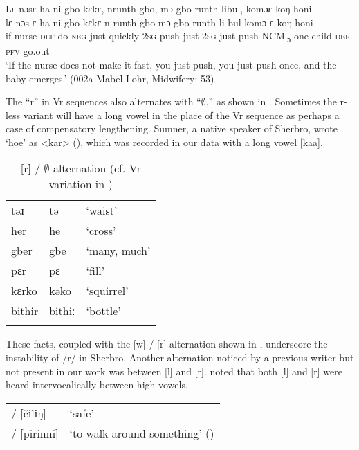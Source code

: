 \ex \label{ex:23b}
Lɛ nɔsɛ ha ni gbo kɛkɛ, nrunth gbo, mɔ gbo runth libul, komɔɛ koŋ honi.\\
\gll lɛ  nɔs  ɛ    ha    ni    gbo  kɛkɛ    n    runth    gbo mɔ  gbo  runth    li-bul        komɔ    ɛ    koŋ  honi\\
if  nurse  \textsc{def}  do    \textsc{neg}  just  quickly  \textsc{2sg}  push    just \textsc{2sg}  just  push    \textsc{NCM}\textsubscript{lɔ}{}-one    child    \textsc{def}  \textsc{pfv}  go.out\\
\glt ‘If the nurse does not make it fast, you just push, you just push once, and the baby emerges.' (002a Mabel Lohr, Midwifery: 53)
\z
\z

The “r” in Vr sequences also alternates with “${\emptyset}$,” as shown in . Sometimes the r-less variant will have a long vowel in the place of the Vr sequence as perhaps a case of compensatory lengthening. Sumner, a native speaker of Sherbro, wrote ‘hoe' as <kar> (\citealt{Sumner1921}), which was recorded in our data with a long vowel [kaa].

\begin{table}
\caption{\label{tab:phon:11}[r] / ${\emptyset}$ alternation (cf. Vr variation in )}
\begin{tabular}[t]{lll}
\lsptoprule
təɹ & tə & ‘waist'\\
her & he & ‘cross'\\
gber & gbe & ‘many, much'\\
pɛr & pɛ & ‘fill'\\
kɛrko & kəko & ‘squirrel'\\
bithir & bithiː & ‘bottle'\\
\lspbottomrule
\end{tabular}
\end{table}

These facts, coupled with the [w] / [r] alternation shown in , underscore the instability of /r/ in Sherbro. Another alternation noticed by a previous writer but not present in our work was between [l] and [r]. \citet{Hanson1979a} noted that both [l] and [r] were heard intervocalically between high vowels.

\ea%
\label{ex:24}
\begin{tabular}[t]{ll}
\relax [čɨrɨŋ] / [čɨlɨŋ] & ‘safe'\\
\relax [pilinni] / [pirinni] & ‘to walk around something' (\citealt[25]{Hanson1979a})\\
\end{tabular}
\z

